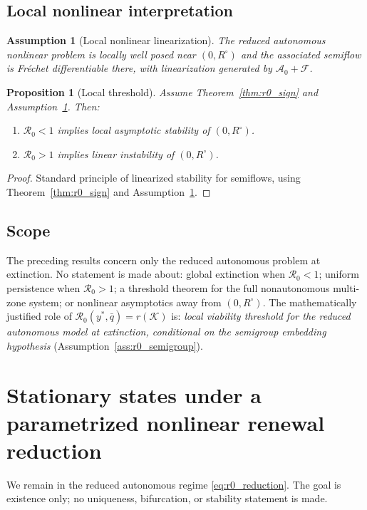 \documentclass[pdflatex,sn-mathphys-num]{sn-jnl}%
\newtheorem{proposition}[theorem]{Proposition}
\newtheorem{assumption}[theorem]{Assumption}
\begin{document}
\subsection{Local nonlinear interpretation}
\begin{assumption}[Local nonlinear linearization]\label{ass:r0_local_nonlinear}
The reduced autonomous nonlinear problem is locally well posed near
\((0,R^\circ)\) and the associated semiflow is Fr\'echet differentiable there,
with linearization generated by \(\mathcal A_0+\mathcal F\).
\end{assumption}

\begin{proposition}[Local threshold]\label{prop:r0_local_threshold}
Assume Theorem~\ref{thm:r0_sign} and Assumption~\ref{ass:r0_local_nonlinear}. Then:
\begin{enumerate}[label=\textup{(\alph*)}]
\item \(\mathcal R_0<1\) implies local asymptotic stability of \((0,R^\circ)\).
\item \(\mathcal R_0>1\) implies linear instability of \((0,R^\circ)\).
\end{enumerate}
\end{proposition}
\begin{proof}
Standard principle of linearized stability for semiflows, using Theorem~\ref{thm:r0_sign} and Assumption~\ref{ass:r0_local_nonlinear}.
\end{proof}

\subsection{Scope}
The preceding results concern only the reduced autonomous problem at extinction.
No statement is made about:
global extinction when \(\mathcal R_0<1\);
uniform persistence when \(\mathcal R_0>1\);
a threshold theorem for the full nonautonomous multi-zone system; or
nonlinear asymptotics away from \((0,R^\circ)\).
The mathematically justified role of
\(\mathcal R_0(y^\ast,\bar q)=r(\mathcal K)\)
is:
\emph{local viability threshold for the reduced autonomous model at extinction,
conditional on the semigroup embedding hypothesis} (Assumption~\ref{ass:r0_semigroup}).


\section{Stationary states under a parametrized nonlinear renewal reduction}%
\label{sec:stationary}
We remain in the reduced autonomous regime \eqref{eq:r0_reduction}.
The goal is existence only; no uniqueness, bifurcation, or stability statement is made.
\end{document}
